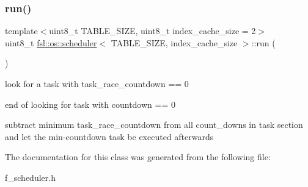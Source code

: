 \subsubsection{\texorpdfstring{run()}{run()}}
{\footnotesize\ttfamily template$<$uint8\+\_\+t T\+A\+B\+L\+E\+\_\+\+S\+I\+ZE, uint8\+\_\+t index\+\_\+cache\+\_\+size = 2$>$ \\
uint8\+\_\+t \mbox{\hyperlink{classfsl_1_1os_1_1scheduler}{fsl\+::os\+::scheduler}}$<$ T\+A\+B\+L\+E\+\_\+\+S\+I\+ZE, index\+\_\+cache\+\_\+size $>$\+::run (\begin{DoxyParamCaption}{ }\end{DoxyParamCaption})\hspace{0.3cm}{\ttfamily [inline]}}

look for a task with task\+\_\+race\+\_\+countdown == 0

end of looking for task with countdown == 0

subtract minimum task\+\_\+race\+\_\+countdown from all count\+\_\+downs in task section and let the min-\/countdown task be executed afterwards 

The documentation for this class was generated from the following file\+:\begin{DoxyCompactItemize}
\item 
f\+\_\+scheduler.\+h\end{DoxyCompactItemize}
